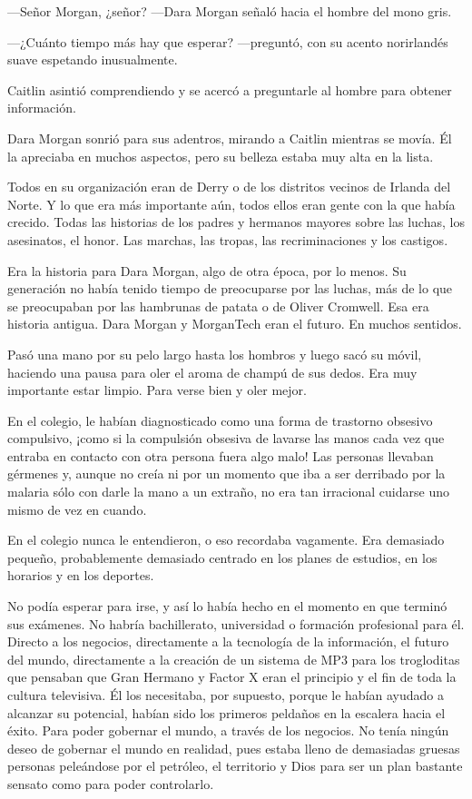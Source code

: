 ---Señor Morgan, ¿señor? ---Dara Morgan señaló hacia el hombre del mono
gris.

---¿Cuánto tiempo más hay que esperar? ---preguntó, con su acento
norirlandés suave espetando inusualmente.

Caitlin asintió comprendiendo y se acercó a preguntarle al hombre para
obtener información.

Dara Morgan sonrió para sus adentros, mirando a Caitlin mientras se
movía. Él la apreciaba en muchos aspectos, pero su belleza estaba muy
alta en la lista.

Todos en su organización eran de Derry o de los distritos vecinos de
Irlanda del Norte. Y lo que era más importante aún, todos ellos eran
gente con la que había crecido. Todas las historias de los padres y
hermanos mayores sobre las luchas, los asesinatos, el honor. Las
marchas, las tropas, las recriminaciones y los castigos.

Era la historia para Dara Morgan, algo de otra época, por lo menos. Su
generación no había tenido tiempo de preocuparse por las luchas, más de
lo que se preocupaban por las hambrunas de patata o de Oliver Cromwell.
Esa era historia antigua. Dara Morgan y MorganTech eran el futuro. En
muchos sentidos.

Pasó una mano por su pelo largo hasta los hombros y luego sacó su móvil,
haciendo una pausa para oler el aroma de champú de sus dedos. Era muy
importante estar limpio. Para verse bien y oler mejor.

En el colegio, le habían diagnosticado como una forma de trastorno
obsesivo compulsivo, ¡como si la compulsión obsesiva de lavarse las
manos cada vez que entraba en contacto con otra persona fuera algo
malo! Las personas llevaban gérmenes y, aunque no creía ni por un
momento que iba a ser derribado por la malaria sólo con darle la mano a
un extraño, no era tan irracional cuidarse uno mismo de vez en cuando.

En el colegio nunca le entendieron, o eso recordaba vagamente. Era
demasiado pequeño, probablemente demasiado centrado en los planes de
estudios, en los horarios y en los deportes.

No podía esperar para irse, y así lo había hecho en el momento en que
terminó sus exámenes. No habría bachillerato, universidad o formación
profesional para él. Directo a los negocios, directamente a la
tecnología de la información, el futuro del mundo, directamente a la
creación de un sistema de MP3 para los trogloditas que pensaban que Gran
Hermano y Factor X eran el principio y el fin de toda la cultura
televisiva. Él los necesitaba, por supuesto, porque le habían ayudado a
alcanzar su potencial, habían sido los primeros peldaños en la escalera
hacia el éxito. Para poder gobernar el mundo, a través de los negocios.
No tenía ningún deseo de gobernar el mundo en realidad, pues estaba
lleno de demasiadas gruesas personas peleándose por el petróleo, el
territorio y Dios para ser un plan bastante sensato como para poder
controlarlo.

